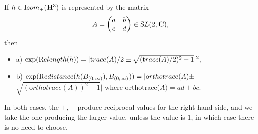 \begin{lemma}{} If $h \in {\textrm Isom}_+({\mathbf H}^3)$ is represented by the matrix $$A = \left(\begin{matrix}a &  b \cr c & d\cr\end{matrix}\right)\in {\mathrm SL}(2,{\mathbf
C}),$$ then 
\begin{itemize}
\item{a)} $\exp({\textrm Relength} (h))= |{\textrm trace}(A)/2 \pm \sqrt{({\textrm trace}(A)/2)^2 - 1}|^2,$

\item{b)} $\exp({\textrm Redistance} (h(B_{(0;\infty)}), B_{(0;\infty)}))=|{\textrm orthotrace}(A) \pm$\hfill \noindent $\sqrt{({\mathrm
orthotrace}(A))^2 - 1}|$  where 
{\textrm orthotrace(}$A) = ad + bc.$ $\phantom{\sum^\int}$
\end{itemize}
In both cases{\textrm ,} the $+, -$ produce reciprocal values for the right\/{\textrm -}\/hand side{\textrm ,}
  and we take the one producing the larger value{\textrm ,} unless the value is $1${\textrm ,} in
which case there is no need to choose.
\end{lemma}

